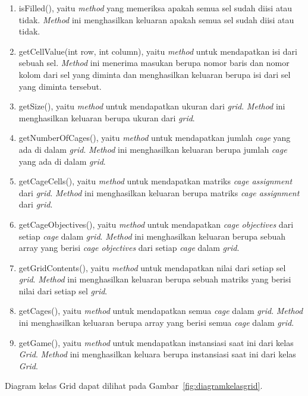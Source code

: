 \begin{enumerate}
\item isFilled(), yaitu \textit{method} yang memeriksa apakah semua sel sudah diisi atau tidak. \textit{Method} ini menghasilkan keluaran apakah semua sel sudah diisi atau tidak.
\item getCellValue(int row, int column), yaitu \textit{method} untuk mendapatkan isi dari sebuah sel. \textit{Method} ini menerima masukan berupa nomor baris dan nomor kolom dari sel yang diminta dan menghasilkan keluaran berupa isi dari sel yang diminta tersebut.
\item getSize(), yaitu \textit{method} untuk mendapatkan ukuran dari \textit{grid}. \textit{Method} ini menghasilkan keluaran berupa ukuran dari \textit{grid}.
\item getNumberOfCages(), yaitu \textit{method} untuk mendapatkan jumlah \textit{cage} yang ada di dalam \textit{grid}. \textit{Method} ini menghasilkan keluaran berupa jumlah \textit{cage} yang ada di dalam \textit{grid}.
\item getCageCells(), yaitu \textit{method} untuk mendapatkan matriks \textit{cage assignment} dari \textit{grid}. \textit{Method} ini menghasilkan keluaran berupa matriks \textit{cage assignment} dari \textit{grid}.
\item getCageObjectives(), yaitu \textit{method} untuk mendapatkan \textit{cage objectives} dari setiap \textit{cage} dalam \textit{grid}. \textit{Method} ini menghasilkan keluaran berupa sebuah array yang berisi \textit{cage objectives} dari setiap \textit{cage} dalam \textit{grid}.
\item getGridContents(), yaitu \textit{method} untuk mendapatkan nilai dari setiap sel \textit{grid}. \textit{Method} ini menghasilkan keluaran berupa sebuah matriks yang berisi nilai dari setiap sel \textit{grid}.
\item getCages(), yaitu \textit{method} untuk mendapatkan semua \textit{cage} dalam \textit{grid}. \textit{Method} ini menghasilkan keluaran berupa array yang berisi semua \textit{cage} dalam \textit{grid}.
\item getGame(), yaitu \textit{method} untuk mendapatkan instansiasi saat ini dari kelas \textit{Grid}. \textit{Method} ini menghasilkan keluara berupa instansiasi saat ini dari kelas \textit{Grid}.
\end{enumerate}

Diagram kelas Grid dapat dilihat pada Gambar~\ref{fig:diagramkelasgrid}.

